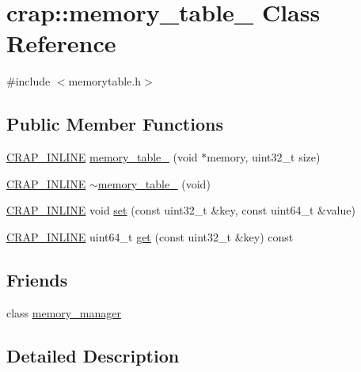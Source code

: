 \hypertarget{classcrap_1_1memory__table__64}{}\section{crap\+:\+:memory\+\_\+table\+\_ Class Reference}
\label{classcrap_1_1memory__table__64}


{\ttfamily \#include $<$memorytable.\+h$>$}

\subsection*{Public Member Functions}
\begin{DoxyCompactItemize}
\item 
\hyperlink{config__x86_8h_a5a40526b8d842e7ff731509998bb0f1c}{C\+R\+A\+P\+\_\+\+I\+N\+L\+I\+N\+E} \hyperlink{classcrap_1_1memory__table__64_a8a0a19a50005a7d370e0f204f7da9581}{memory\+\_\+table\+\_} (void $\ast$memory, uint32\+\_\+t size)
\item 
\hyperlink{config__x86_8h_a5a40526b8d842e7ff731509998bb0f1c}{C\+R\+A\+P\+\_\+\+I\+N\+L\+I\+N\+E} \hyperlink{classcrap_1_1memory__table__64_a7703ea803271bdb8c93ac3a15857c20a}{$\sim$memory\+\_\+table\+\_} (void)
\item 
\hyperlink{config__x86_8h_a5a40526b8d842e7ff731509998bb0f1c}{C\+R\+A\+P\+\_\+\+I\+N\+L\+I\+N\+E} void \hyperlink{classcrap_1_1memory__table__64_aba67657c7f5255aa2dbf100ada039fc4}{set} (const uint32\+\_\+t \&key, const uint64\+\_\+t \&value)
\item 
\hyperlink{config__x86_8h_a5a40526b8d842e7ff731509998bb0f1c}{C\+R\+A\+P\+\_\+\+I\+N\+L\+I\+N\+E} uint64\+\_\+t \hyperlink{classcrap_1_1memory__table__64_ad963ac54fede72185c9d90f96ae522b1}{get} (const uint32\+\_\+t \&key) const 
\end{DoxyCompactItemize}
\subsection*{Friends}
\begin{DoxyCompactItemize}
\item 
class \hyperlink{classcrap_1_1memory__table__64_a242c93ac6853d673bc3e068a57510842}{memory\+\_\+manager}
\end{DoxyCompactItemize}


\subsection{Detailed Description}


